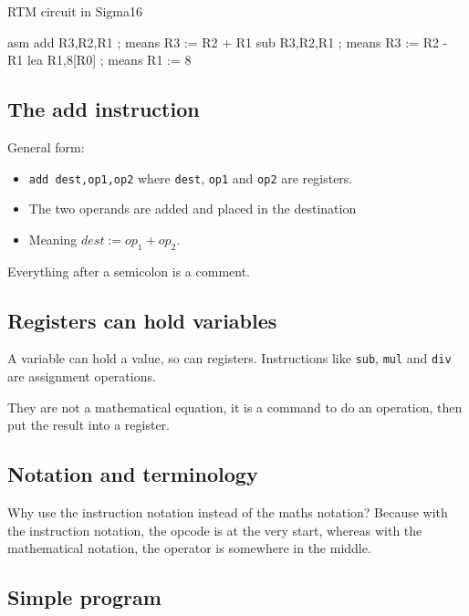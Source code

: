 \begin{highlight}{RTM circuit in Sigma16}
	\begin{code}{asm}
		add R3,R2,R1 ; means R3 := R2 + R1
		sub R3,R2,R1 ; means R3 := R2 - R1
		lea R1,8[R0] ; means R1 := 8
	\end{code}
\end{highlight}

\subsection{The add instruction}\label{sub:the_add_instruction}

General form:
\begin{itemize}
	\item \texttt{add dest,op1,op2} where \texttt{dest}, \texttt{op1} and \texttt{op2} are registers.
	\item The two operands are added and placed in the destination
	\item Meaning \(dest:=op_1+op_2\).
\end{itemize}

Everything after a semicolon is a comment.

\subsection{Registers can hold variables}\label{sub:registers_can_hold_variables}

A variable can hold a value, so can registers.
Instructions like \texttt{sub}, \texttt{mul} and \texttt{div} are assignment operations.

\begin{note}
	They are not a mathematical equation, it is a command to do an operation, then put the result into a register.
\end{note}

\subsection{Notation and terminology}\label{sub:notation_and_terminology}

Why use the instruction notation instead of the maths notation? Because with the instruction notation, the opcode is at the very start, whereas with the mathematical notation, the operator is somewhere in the middle.

\subsection{Simple program}\label{sub:simple_program}

